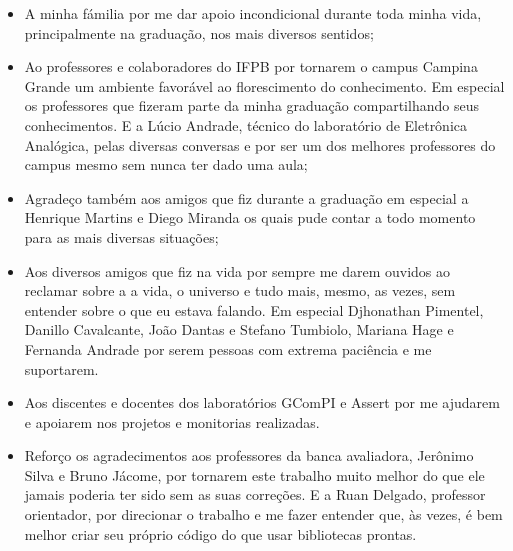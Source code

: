 \begin{agradecimentos}
  \begin{itemize}
    \item A minha fámilia por me dar apoio incondicional durante toda minha vida, principalmente na graduação, nos mais diversos sentidos;
    \item Ao professores e colaboradores do IFPB por tornarem o campus Campina Grande um ambiente favorável ao florescimento do conhecimento. Em especial os professores que fizeram parte da minha graduação compartilhando seus conhecimentos. E a Lúcio Andrade, técnico do laboratório de Eletrônica Analógica, pelas diversas conversas e por ser um dos melhores professores do campus mesmo sem nunca ter dado uma aula;
    \item Agradeço também aos amigos que fiz durante a graduação em especial a Henrique Martins e Diego Miranda os quais pude contar a todo momento para as mais diversas situações;
    \item Aos diversos amigos que fiz na vida por sempre me darem ouvidos ao reclamar sobre a a vida, o universo e tudo mais, mesmo, as vezes, sem entender sobre o que eu estava falando. Em especial Djhonathan Pimentel, Danillo Cavalcante, João Dantas e Stefano Tumbiolo, Mariana Hage e Fernanda Andrade por serem pessoas com extrema paciência e me suportarem.
    \item Aos discentes e docentes dos laboratórios GComPI e Assert por me ajudarem e apoiarem nos projetos e monitorias realizadas.
    \item Reforço os agradecimentos aos professores da banca avaliadora, Jerônimo Silva e Bruno Jácome, por tornarem este trabalho muito melhor do que ele jamais poderia ter sido sem as suas correções. E a Ruan Delgado, professor orientador, por direcionar o trabalho e me fazer entender que, às vezes, é bem melhor criar seu próprio código do que usar bibliotecas prontas.
  \end{itemize}
\end{agradecimentos}
